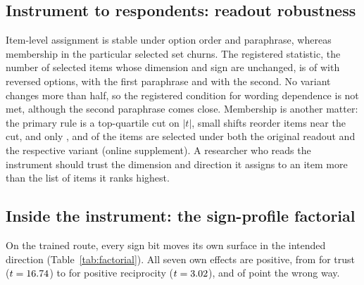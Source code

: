 \subsection{Instrument to respondents: readout robustness}\label{sec:res-readout}

Item-level assignment is stable under option order and paraphrase, whereas membership in the particular selected set churns. The registered statistic, the number of selected items whose dimension and sign are unchanged, is  of  with reversed options,  with the first paraphrase and  with the second. No variant changes more than half, so the registered condition for wording dependence is not met, although the second paraphrase comes close. Membership is another matter: the primary rule is a top-quartile cut on $|t|$, small shifts reorder items near the cut, and only ,  and  of the  items are selected under both the original readout and the respective variant (online supplement). A researcher who reads the instrument should trust the dimension and direction it assigns to an item more than the list of items it ranks highest.

\subsection{Inside the instrument: the sign-profile factorial}\label{sec:res-factorial}



On the trained route, every sign bit moves its own surface in the intended direction (Table~\ref{tab:factorial}). All seven own effects are positive, from  for trust ($t=\cl{16.74}{FX_adapter64_trust_own_t}$) to  for positive reciprocity ($t=\cl{3.02}{FX_adapter64_posrecip_own_t}$), and  of  point the wrong way.

